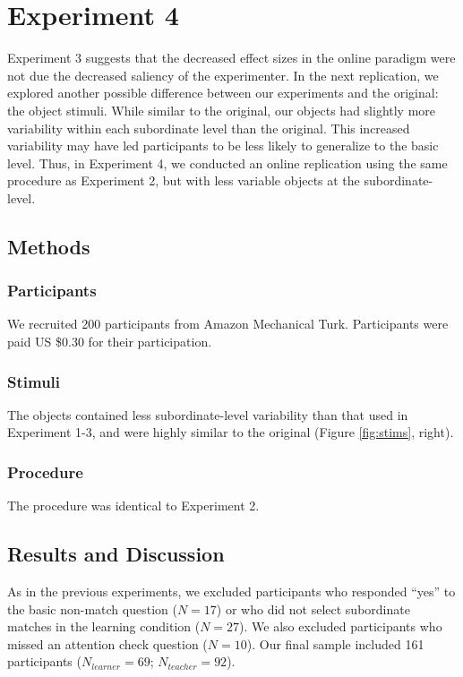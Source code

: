 \documentclass[man]{apa2}
\begin{document}
\section{Experiment 4}
Experiment 3 suggests that the decreased effect sizes in the online paradigm were not due the decreased saliency of the experimenter. In the next replication, we explored another possible difference between our experiments and the original: the object stimuli. While similar to the original, our objects had slightly more variability within each subordinate level than the original. This increased variability may have led participants to be less likely to generalize to the basic level. Thus, in Experiment 4, we conducted an online replication using the same procedure as Experiment 2, but with less variable objects at the subordinate-level. 

\subsection{Methods}

\subsubsection{Participants}  We recruited 200 participants from Amazon Mechanical Turk. Participants were paid US \$0.30 for their participation.

\subsubsection{Stimuli}
The objects contained less subordinate-level variability than that used in Experiment 1-3, and were highly similar to the original (Figure \ref{fig:stims}, right).

\subsubsection{Procedure}
The procedure was identical to Experiment 2.

\subsection{Results and Discussion}

As in the previous experiments, we excluded participants who responded ``yes'' to the basic non-match question ($N=17$) or who did not select subordinate matches in the learning condition ($N = 27$). We also excluded participants who missed an attention check question ($N = 10$). Our final sample included 161 participants ($N_{learner} = 69$; $N_{teacher} = 92$).
\end{document}
